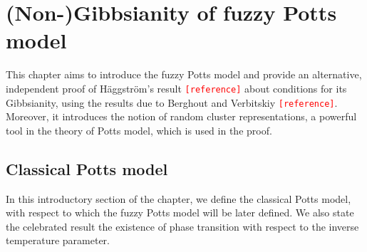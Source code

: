 \documentclass[12pt]{article}
\newcommand{\1}{\mathbbm{1}}
\newcommand{\5}{\vspace{0.5cm}}
\theoremstyle{definition}
\begin{document}
\section{(Non-)Gibbsianity of fuzzy Potts model}

This chapter aims to introduce the fuzzy Potts model and provide an alternative, independent proof of H\"aggstr\"om's result \textcolor{red}{\texttt{[reference]}} about conditions for its Gibbsianity, using the results due to Berghout and Verbitskiy \textcolor{red}{\texttt{[reference]}}. Moreover, it introduces the notion of random cluster representations, a powerful tool in the theory of Potts model, which is used in the proof.


\subsection{Classical Potts model}

In this introductory section of the chapter, we define the classical Potts model, with respect to which the fuzzy Potts model will be later defined. We also state the celebrated result the existence of phase transition with respect to the inverse temperature parameter. \\
\end{document}
